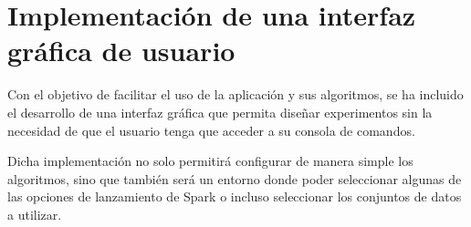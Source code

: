 \section{Implementación de una interfaz gráfica de usuario}

Con el objetivo de facilitar el uso de la aplicación y sus algoritmos, se ha incluido el desarrollo de una interfaz gráfica que permita diseñar experimentos sin la necesidad de que el usuario tenga que acceder a su consola de comandos.

Dicha implementación no solo permitirá configurar de manera simple los algoritmos, sino que también será un entorno donde poder seleccionar algunas de las opciones de lanzamiento de Spark o incluso seleccionar los conjuntos de datos a utilizar.


